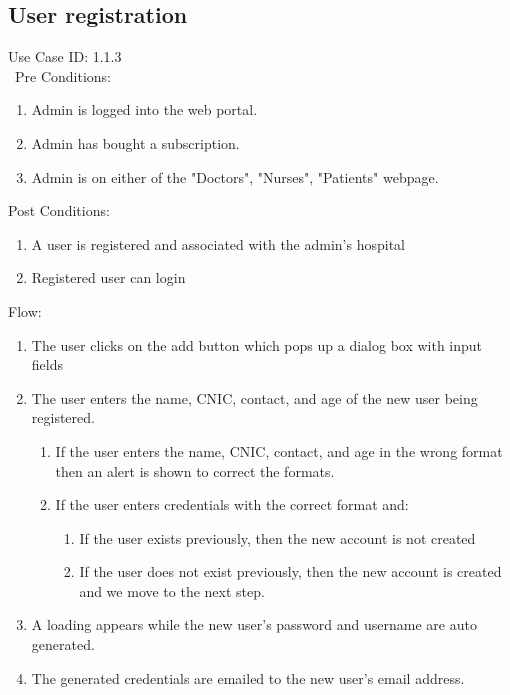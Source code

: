 \subsection{User registration} 
Use Case ID: 1.1.3\\\
Pre Conditions: 
\begin{enumerate}
    \item Admin is logged into the web portal. 
    \item Admin has bought a subscription.
    \item Admin is on either of the "Doctors", "Nurses", "Patients" webpage.
\end{enumerate}
Post Conditions: 
\begin{enumerate}
    \item A user is registered and associated with the admin's hospital
    \item Registered user can login
\end{enumerate}
Flow: 
\begin{enumerate}
    \item The user clicks on the add button which pops up a dialog box with input fields
    \item The user enters the name, CNIC, contact, and age of the new user being registered.
    \begin{enumerate}
        \item If the user enters the name, CNIC, contact, and age in the wrong format then an alert is shown to correct the formats.
        \item If the user enters credentials with the correct format and:
        \begin{enumerate}
            \item If the user exists previously, then the new account is not created
            \item If the user does not exist previously, then the new account is created and we move to the next step.
        \end{enumerate}
    \end{enumerate}
    \item   A loading appears while the new user's password and username are auto generated.
    \item The generated credentials are emailed to the new user's email address.
\end{enumerate}
